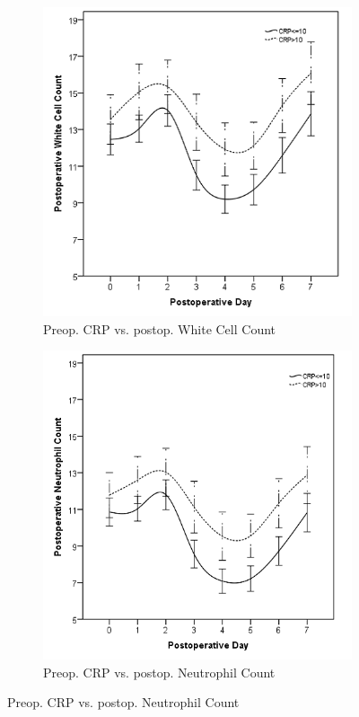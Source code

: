 \begin{figure}[p]
	\begin{subfigure}{0.48\textwidth}
		\centering
		\includegraphics[width=\textwidth]{Figures/sirs_crp_wcc}
		\caption{Preop. CRP vs. postop. White Cell Count}
		\label{fig:sirs_crp_wcc}
	\end{subfigure}
	\hfill
	\begin{subfigure}{0.48\textwidth}
		\centering
		\includegraphics[width=\textwidth]{Figures/sirs_crp_neut}
		\caption{Preop. CRP vs. postop. Neutrophil Count}
		\label{fig:sirs_crp_neut}
	\end{subfigure}	
\end{figure}

